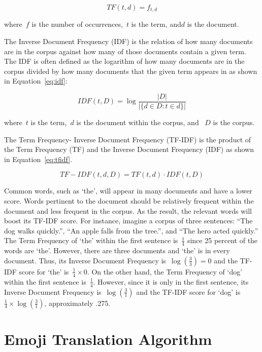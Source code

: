 \documentclass{article}[10]
\begin{document}
\begin{equation}
  TF(t, d) = f_{t, d} \label{eq:tf}
\end{equation}

where~\(f\) is the number of occurrences,~\(t\) is the term, and\(d\) is
the document.

The Inverse Document Frequency (IDF) is the relation of how many
documents are in the corpus against how many of those documents contain
a given term. The IDF is often defined as the logarithm of how many
documents are in the corpus divided by how many documents that the given
term appears in as shown in Equation~\eqref{eq:idf}:

\begin{equation}
  IDF(t, D) = \log\frac{|D|}{|\{d \in D : t \in d\}|} \label{eq:idf}
\end{equation}

where~\(t\) is the term,~\(d\) is the
document within the corpus, and ~\(D\) is the corpus.

The Term Frequency- Inverse Document Frequency (TF-IDF) is the product
of the Term Frequency (TF) and the Inverse Document Frequency (IDF) as
shown in Equation~\eqref{eq:tfidf}.

\begin{equation}
  TF-IDF(t, d, D) = TF(t, d) \cdot IDF(t, D) \label{eq:tfidf}
\end{equation}

Common words, such as `the', will appear in many documents and have a
lower score. Words pertinent to the document should be relatively
frequent within the document and less frequent in the corpus. As the
result, the relevant words will boost its TF-IDF score. For instance,
imagine a corpus of three sentences: ``The dog walks quickly.'', ``An
apple falls from the tree.'', and ``The hero acted quickly.'' The Term
Frequency of `the' within the first sentence is~\(\frac{1}{4}\)
since 25 percent of the words are `the'. However, there are three
documents and `the' is in every document. Thus, its Inverse Document
Frequency is~\(\log(\frac{3}{3}) = 0\) and the TF-IDF score for `the'
is~\(\frac{1}{4} \times 0\). On the other hand, the Term Frequency of `dog'
within the first sentence is~\(\frac{1}{4}\). However, since it is
only in the first sentence, its Inverse Document Frequency
is~\(\log(\frac{3}{1})\) and the TF-IDF score for `dog'
is~\(\frac{1}{4} \times \log(\frac{3}{1})\), approximately .275.

\section{Emoji Translation Algorithm\label{sec:EmojiTranslationAlgorithm}}
\end{document}
